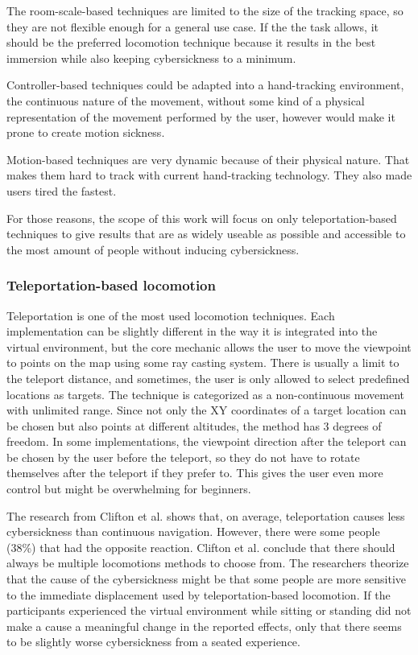 The room-scale-based techniques are limited to the size of the tracking
space, so they are not flexible enough for a general use case. If the
the task allows, it should be the preferred locomotion technique
because it results in the best immersion while also keeping
cybersickness to a minimum.

Controller-based techniques could be adapted into a hand-tracking
environment, the continuous nature of the movement, without some kind of
a physical representation of the movement performed by the user, however
would make it prone to create motion sickness.

Motion-based techniques are very dynamic because of their physical
nature. That makes them hard to track with current hand-tracking
technology. They also made users tired the fastest.

For those reasons, the scope of this work will focus on only
teleportation-based techniques to give results that are as widely useable as
possible and accessible to the most amount of people without inducing
cybersickness.

\subsubsection{Teleportation-based locomotion}\label{teleportation-based-locomotion}

Teleportation is one of the most used locomotion techniques. Each
implementation can be slightly different in the way it is integrated
into the virtual environment, but the core mechanic allows the user to
move the viewpoint to points on the map using some ray casting system.
There is usually a limit to the teleport distance, and sometimes, the user
is only allowed to select predefined locations as targets. The technique
is categorized as a non-continuous movement with unlimited range. Since not
only the XY coordinates of a target location can be chosen but also
points at different altitudes, the method has 3 degrees of freedom. In some implementations, the viewpoint direction after the teleport can be chosen by the user before the teleport, so they do not have to rotate themselves after the teleport if they prefer to. This gives the user even more control but might be overwhelming for beginners.

The research from Clifton et al. \cite{Clifton} shows that, on average, teleportation
causes less cybersickness than continuous navigation. However, there were
some people (38\%) that had the opposite reaction.
Clifton et al. conclude that there should always be multiple locomotions
methods to choose from. The researchers theorize that the cause of the
cybersickness might be that some people are more sensitive to the
immediate displacement used by teleportation-based locomotion. If the
participants experienced the virtual environment while sitting or
standing did not make a cause a meaningful change in the reported
effects, only that there seems to be slightly worse cybersickness from a
seated experience. 

